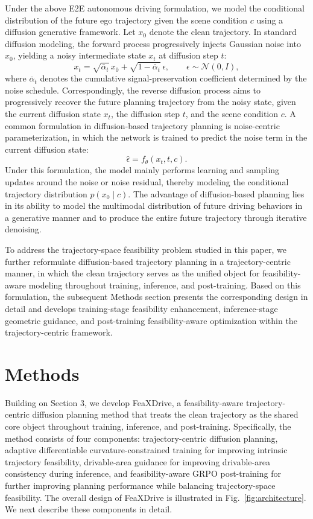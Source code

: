 \documentclass[3p,times,authoryear]{elsarticle}
\begin{document}
Under the above E2E autonomous driving formulation, we model the conditional distribution of the future ego trajectory given the scene condition \(c\) using a diffusion generative framework. Let $x_0$ denote the clean trajectory. In standard diffusion modeling, the forward process progressively injects Gaussian noise into $x_0$, yielding a noisy intermediate state $x_t$ at diffusion step $t$:
\begin{equation}
x_t = \sqrt{\bar{\alpha}_t}\, x_0 + \sqrt{1-\bar{\alpha}_t}\, \epsilon,
\qquad
\epsilon \sim \mathcal{N}(0, I),
\end{equation}
where $\bar{\alpha}_t$ denotes the cumulative signal-preservation coefficient determined by the noise schedule.
Correspondingly, the reverse diffusion process aims to progressively recover the future planning trajectory from the noisy state, given the current diffusion state $x_t$, the diffusion step $t$, and the scene condition $c$. A common formulation in diffusion-based trajectory planning is noise-centric parameterization, in which the network is trained to predict the noise term in the current diffusion state:
\begin{equation}
\hat{\epsilon} = f_{\theta}(x_t, t, c).
\end{equation}
Under this formulation, the model mainly performs learning and sampling updates around the noise or noise residual, thereby modeling the conditional trajectory distribution $p(x_0 \mid c)$. The advantage of diffusion-based planning lies in its ability to model the multimodal distribution of future driving behaviors in a generative manner and to produce the entire future trajectory through iterative denoising. 

To address the trajectory-space feasibility problem studied in this paper, we further reformulate diffusion-based trajectory planning in a trajectory-centric manner, in which the clean trajectory serves as the unified object for feasibility-aware modeling throughout training, inference, and post-training. Based on this formulation, the subsequent Methods section presents the corresponding design in detail and develops training-stage feasibility enhancement, inference-stage geometric guidance, and post-training feasibility-aware optimization within the trajectory-centric framework.


\section{Methods}

Building on Section 3, we develop FeaXDrive, a feasibility-aware trajectory-centric diffusion planning method that treats the clean trajectory as the shared core object throughout training, inference, and post-training. Specifically, the method consists of four components: trajectory-centric diffusion planning, adaptive differentiable curvature-constrained training for improving intrinsic trajectory feasibility, drivable-area guidance for improving drivable-area consistency during inference, and feasibility-aware GRPO post-training for further improving planning performance while balancing trajectory-space feasibility. The overall design of FeaXDrive is illustrated in Fig.~\ref{fig:architecture}. We next describe these components in detail.
\end{document}
